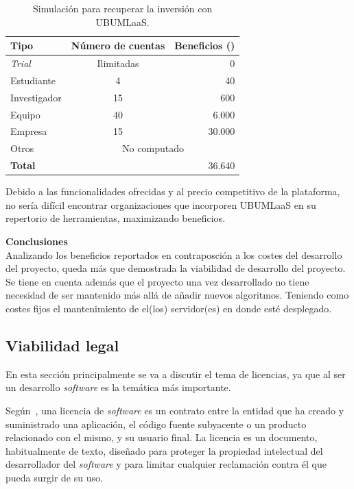 \begin{table}[H]
\centering
\begin{tabular}{lcr}
	\toprule
	\textbf{Tipo}     & \textbf{Número de cuentas} & \textbf{Beneficios (\officialeuro)}\\
	\midrule
	\textit{Trial}        & Ilimitadas & 0 \\
	Estudiante   & 4 & 40 \\
	Investigador  & 15 & 600 \\
	Equipo  & 40 & 6.000 \\
	Empresa & 15 & 30.000 \\
	Otros & \multicolumn{2}{c}{No computado} \\
	\midrule
	\textbf{Total} &&36.640 \\
	\bottomrule
\end{tabular}
\caption{Simulación para recuperar la inversión con UBUMLaaS.}\label{tab:simulacion-clientes}
\end{table}

Debido a las funcionalidades ofrecidas y al precio competitivo de la plataforma, no sería difícil encontrar organizaciones que incorporen UBUMLaaS en su repertorio de herramientas, maximizando beneficios.

\textbf{Conclusiones}\\
Analizando los beneficios reportados en contraposción a los costes del desarrollo del proyecto, queda más que demostrada la viabilidad de desarrollo del proyecto. Se tiene en cuenta además que el proyecto una vez desarrollado no tiene necesidad de ser mantenido más allá de añadir nuevos algoritmos. Teniendo como costes fijos el mantenimiento de el(los) servidor(es) en donde esté desplegado.

\subsection{Viabilidad legal}

En esta sección principalmente se va a discutir el tema de licencias, ya que al ser un desarrollo \textit{software} es la temática más importante.

Según~\cite{softwareLicense}, una licencia de \textit{software} es un contrato entre la entidad que ha creado y suministrado una aplicación, el código fuente subyacente o un producto relacionado con el mismo, y su usuario final.  La licencia es un documento, habitualmente de texto, diseñado para proteger la propiedad intelectual del desarrollador del \textit{software} y para limitar cualquier reclamación contra él que pueda surgir de su uso.

